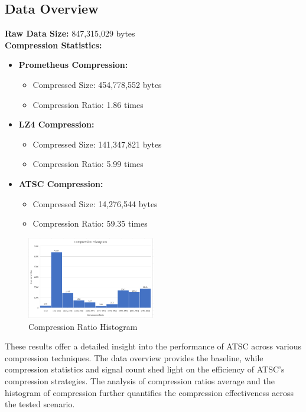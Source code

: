 \documentclass[conference]{IEEEtran}
\begin{document}
\subsection{Data Overview}

\textbf{Raw Data Size:} 847,315,029 bytes \\
\textbf{Compression Statistics:}

\begin{itemize}
    \item \textbf{Prometheus Compression:}
    \begin{itemize}
        \item Compressed Size: 454,778,552 bytes
        \item Compression Ratio: 1.86 times
    \end{itemize}
    \item \textbf{LZ4 Compression:}
    \begin{itemize}
        \item Compressed Size: 141,347,821 bytes
        \item Compression Ratio: 5.99 times
    \end{itemize}
    \item \textbf{ATSC Compression:}
    \begin{itemize}
        \item Compressed Size: 14,276,544 bytes
        \item Compression Ratio: 59.35 times
    \end{itemize}
\end{itemize}

\begin{figure}[h]
  \centering
  \includegraphics[width=0.5\textwidth]{Fig5.png}
  \caption{Compression Ratio Histogram}
  \label{Fig.6}
\end{figure}

\vspace{10pt}
These results offer a detailed insight into the performance of ATSC across various compression techniques. 
The data overview provides the baseline, while compression statistics and signal count shed light on the efficiency of ATSC's compression strategies. 
The analysis of compression ratios average and the histogram of compression further quantifies the compression effectiveness across the tested scenario. 
 
\end{document}
